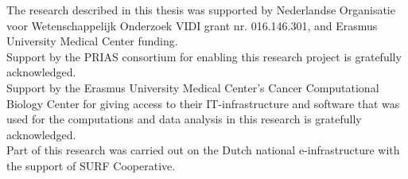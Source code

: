\documentclass[12pt]{article}
\begin{document}
\noindent The research described in this thesis was supported by Nederlandse Organisatie voor Wetenschappelijk Onderzoek VIDI grant nr. 016.146.301, and Erasmus University Medical Center funding.\\

\noindent Support by the PRIAS consortium for enabling this research project is gratefully acknowledged.\\

\noindent Support by the Erasmus University Medical Center's Cancer Computational Biology Center for giving access to their IT-infrastructure and software that was used for the computations and data analysis in this research is gratefully acknowledged.\\

\noindent Part of this research was carried out on the Dutch national e-infrastructure with the support of SURF Cooperative.\\
\end{document}
